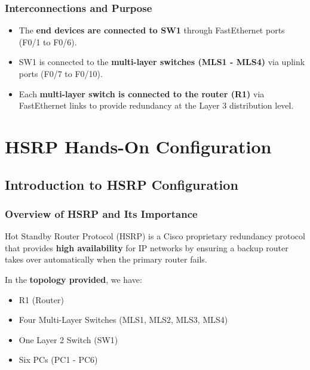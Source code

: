 \documentclass[a4paper]{book}
\begin{document}
\subsection*{Interconnections and Purpose}
\begin{itemize}
\item The \textbf{end devices are connected to SW1} through FastEthernet ports (F0/1 to F0/6).
\item SW1 is connected to the \textbf{multi-layer switches (MLS1 - MLS4)} via uplink ports (F0/7 to F0/10).
\item Each \textbf{multi-layer switch is connected to the router (R1)} via FastEthernet links to provide redundancy at the Layer 3 distribution level.
\end{itemize}



\chapter{HSRP Hands-On Configuration}



\section{Introduction to HSRP Configuration}

\subsection{Overview of HSRP and Its Importance}
Hot Standby Router Protocol (HSRP) is a Cisco proprietary redundancy protocol that provides 
\textbf{high availability} for IP networks by ensuring a backup router takes over automatically 
when the primary router fails.

In the \textbf{topology provided}, we have:
\begin{itemize}
\item R1 (Router)
\item Four Multi-Layer Switches (MLS1, MLS2, MLS3, MLS4)
\item One Layer 2 Switch (SW1)
\item Six PCs (PC1 - PC6)
\end{itemize}
\end{document}
